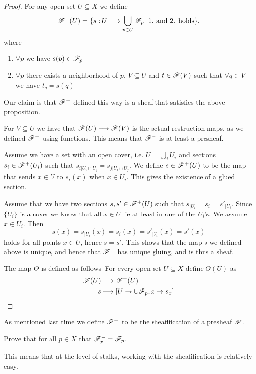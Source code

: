 \begin{proof}
For any open set $U\subseteq X$ we define 
\begin{equation*}
    \mathscr{F}^+(U) = \{ s:U\longrightarrow \bigcup_{p\in U}\mathscr{F}_p \,\vert\, \text{1. and 2. holds}\},
\end{equation*}
where 
\begin{enumerate}
    \item $\forall p$ we have $s(p)\in \mathscr{F}_p$
    \item $\forall p$ there exists a neighborhood of $p$, $V\subseteq U$ and $t\in \mathscr{F}(V)$ such that $\forall q\in V$ we have $t_q=s(q)$
\end{enumerate}
Our claim is that $\mathscr{F}^+$ defined this way is a sheaf that satisfies the above proposition. 

For $V\subseteq U$ we have that $\mathscr{F}(U)\longrightarrow \mathscr{F}(V)$ is the actual restruction maps, as we defined $\mathscr{F}^+$ using functions. This means that $\mathscr{F}^+$ is at least a presheaf. 

Assume we have a set with an open cover, i.e. $U=\bigcup_{i} U_i$ and sections $s_i\in \mathscr{F}^+(U_i)$ such that $s_{i\vert U_i\cap U_j} = s_{j\vert U_i\cap U_j}$. We define $s\in \mathscr{F}^+(U)$ to be the map that sends $x\in U$ to $s_i(x)$ when $x\in U_i$. This gives the existence of a glued section. 

Assume that we have two sections $s, s'\in \mathscr{F}^+(U)$ such that $s_{\vert U_i}=s_i = s'_{\vert U_i}$. Since $\{U_i\}$ is a cover we know that all $x\in U$ lie at least in one of the $U_i$'s. We assume $x\in U_i$. Then \begin{equation*}
    s(x)=s_{\vert U_i}(x) = s_i(x)=s'_{\vert U_i}(x) = s'(x)
\end{equation*}
holds for all points $x\in U$, hence $s=s'$. This shows that the map $s$ we defined above is unique, and hence that $\mathscr{F}^+$ has unique gluing, and is thus a sheaf.  

The map $\Theta$ is defined as follows. For every open set $U\subseteq X$ define $\Theta(U)$ as
\begin{align*}
    \mathscr{F}(U)&\longrightarrow \mathscr{F}^+(U) \\
    s&\longmapsto [U\rightarrow \cup \mathscr{F}_p, x\mapsto s_x]
\end{align*}
\end{proof}

As mentioned last time we define $\mathscr{F}^+$ to be the sheafification of a presheaf $\mathscr{F}$.


\begin{problem}
Prove that for all $p\in X$ that $\mathscr{F}^+_p = \mathscr{F}_p$.
\end{problem}
This means that at the level of stalks, working with the sheafification is relatively easy.

